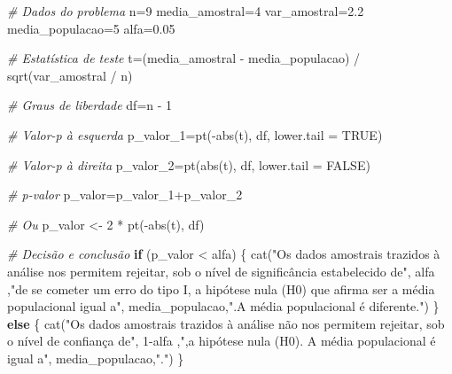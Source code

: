 \documentclass[
]{book}
\newenvironment{Shaded}{\begin{snugshade}}{\end{snugshade}}
\newcommand{\AttributeTok}[1]{\textcolor[rgb]{0.77,0.63,0.00}{#1}}
\newcommand{\CommentTok}[1]{\textcolor[rgb]{0.56,0.35,0.01}{\textit{#1}}}
\newcommand{\ConstantTok}[1]{\textcolor[rgb]{0.00,0.00,0.00}{#1}}
\newcommand{\ControlFlowTok}[1]{\textcolor[rgb]{0.13,0.29,0.53}{\textbf{#1}}}
\newcommand{\DecValTok}[1]{\textcolor[rgb]{0.00,0.00,0.81}{#1}}
\newcommand{\FloatTok}[1]{\textcolor[rgb]{0.00,0.00,0.81}{#1}}
\newcommand{\FunctionTok}[1]{\textcolor[rgb]{0.00,0.00,0.00}{#1}}
\newcommand{\NormalTok}[1]{#1}
\newcommand{\OtherTok}[1]{\textcolor[rgb]{0.56,0.35,0.01}{#1}}
\newcommand{\SpecialCharTok}[1]{\textcolor[rgb]{0.00,0.00,0.00}{#1}}
\newcommand{\StringTok}[1]{\textcolor[rgb]{0.31,0.60,0.02}{#1}}
\begin{document}
\begin{Shaded}
\begin{Highlighting}[]
\CommentTok{\# Dados do problema}
\NormalTok{n}\OtherTok{=}\DecValTok{9}
\NormalTok{media\_amostral}\OtherTok{=}\DecValTok{4}
\NormalTok{var\_amostral}\OtherTok{=}\FloatTok{2.2}
\NormalTok{media\_populacao}\OtherTok{=}\DecValTok{5}
\NormalTok{alfa}\OtherTok{=}\FloatTok{0.05}

\CommentTok{\# Estatística de teste}
\NormalTok{t}\OtherTok{=}\NormalTok{(media\_amostral }\SpecialCharTok{{-}}\NormalTok{ media\_populacao) }\SpecialCharTok{/} \FunctionTok{sqrt}\NormalTok{(var\_amostral }\SpecialCharTok{/}\NormalTok{ n)}

\CommentTok{\# Graus de liberdade}
\NormalTok{df}\OtherTok{=}\NormalTok{n }\SpecialCharTok{{-}} \DecValTok{1}

\CommentTok{\# Valor{-}p à esquerda}
\NormalTok{p\_valor\_1}\OtherTok{=}\FunctionTok{pt}\NormalTok{(}\SpecialCharTok{{-}}\FunctionTok{abs}\NormalTok{(t), df, }\AttributeTok{lower.tail =} \ConstantTok{TRUE}\NormalTok{)}

\CommentTok{\# Valor{-}p à direita}
\NormalTok{p\_valor\_2}\OtherTok{=}\FunctionTok{pt}\NormalTok{(}\FunctionTok{abs}\NormalTok{(t), df, }\AttributeTok{lower.tail =} \ConstantTok{FALSE}\NormalTok{)}

\CommentTok{\# p{-}valor}
\NormalTok{p\_valor}\OtherTok{=}\NormalTok{p\_valor\_1}\SpecialCharTok{+}\NormalTok{p\_valor\_2}

\CommentTok{\# Ou}
\NormalTok{p\_valor }\OtherTok{\textless{}{-}} \DecValTok{2} \SpecialCharTok{*} \FunctionTok{pt}\NormalTok{(}\SpecialCharTok{{-}}\FunctionTok{abs}\NormalTok{(t), df)}

\CommentTok{\# Decisão e conclusão}
\ControlFlowTok{if}\NormalTok{ (p\_valor }\SpecialCharTok{\textless{}}\NormalTok{ alfa) \{}
  \FunctionTok{cat}\NormalTok{(}\StringTok{"Os dados amostrais trazidos à análise nos permitem rejeitar, sob o nível de significância estabelecido de"}\NormalTok{, alfa ,}\StringTok{"de se cometer um erro do tipo I, a hipótese nula (H0) que afirma ser a média populacional igual a"}\NormalTok{, media\_populacao,}\StringTok{".A média populacional  é diferente."}\NormalTok{)}
\NormalTok{\} }\ControlFlowTok{else}\NormalTok{ \{}
  \FunctionTok{cat}\NormalTok{(}\StringTok{"Os dados amostrais trazidos à análise não nos permitem rejeitar, sob o nível de confiança de"}\NormalTok{, }\DecValTok{1}\SpecialCharTok{{-}}\NormalTok{alfa ,}\StringTok{",a hipótese nula (H0). A média populacional é igual a"}\NormalTok{, media\_populacao,}\StringTok{"."}\NormalTok{)}
\NormalTok{\}}
\end{Highlighting}
\end{Shaded}
\end{document}
